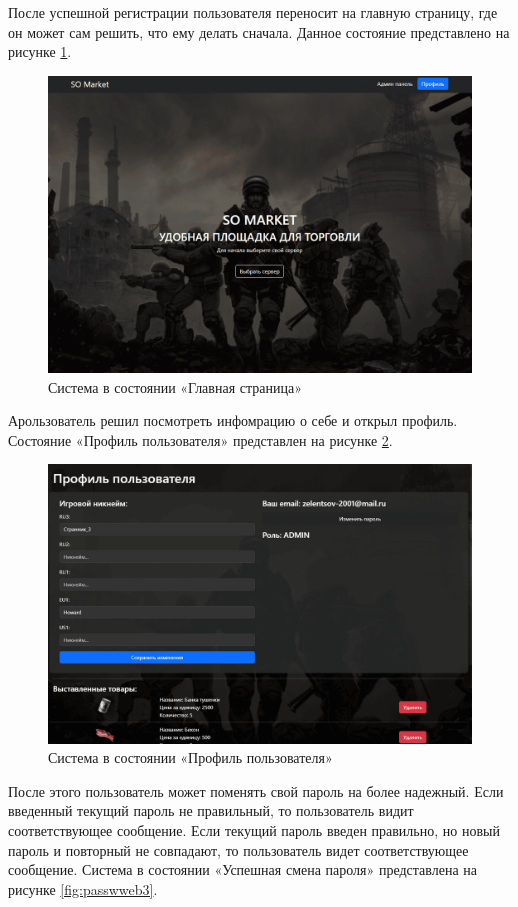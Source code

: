 После успешной регистрации пользователя переносит на главную страницу, где он может сам решить, что ему делать сначала. Данное состояние представлено на рисунке \ref{fig:mainweb}.

\begin{figure}[ht]
	\centering
	\includegraphics[width=0.7\linewidth]{images/main_web}
	\caption{Система в состоянии «Главная страница»}
	\label{fig:mainweb}
\end{figure}

Арользователь решил посмотреть инфомрацию о себе и открыл профиль. Состояние «Профиль пользователя» представлен на рисунке \ref{fig:profileweb}.

\begin{figure}[ht]
	\centering
	\includegraphics[width=0.7\linewidth]{images/profile_web}
	\caption{Система в состоянии «Профиль пользователя»}
	\label{fig:profileweb}
\end{figure}

После этого пользователь может поменять свой пароль на более надежный. Если введенный текущий пароль не правильный, то пользователь видит соответствующее сообщение. Если текущий пароль введен правильно, но новый пароль и повторный не совпадают, то пользователь видет соответствующее сообщение. Система в состоянии «Успешная смена пароля» представлена на рисунке \ref{fig:passwweb3}.

